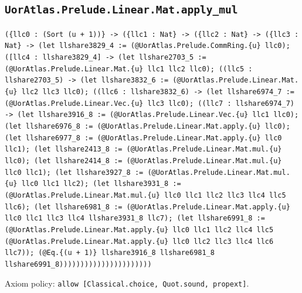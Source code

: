 \documentclass[11pt]{article}
\begin{document}
\subsection*{\texttt{UorAtlas.Prelude.Linear.Mat.apply\_mul}}
\noindent\texttt{(\{llc0 : (Sort (u + 1))\} -> (\{llc1 : Nat\} -> (\{llc2 : Nat\} -> (\{llc3 : Nat\} -> (let llshare3829\_4 := (@UorAtlas.Prelude.CommRing.\{u\} llc0); ([llc4 : llshare3829\_4] -> (let llshare2703\_5 := (@UorAtlas.Prelude.Linear.Mat.\{u\} llc1 llc2 llc0); ((llc5 : llshare2703\_5) -> (let llshare3832\_6 := (@UorAtlas.Prelude.Linear.Mat.\{u\} llc2 llc3 llc0); ((llc6 : llshare3832\_6) -> (let llshare6974\_7 := (@UorAtlas.Prelude.Linear.Vec.\{u\} llc3 llc0); ((llc7 : llshare6974\_7) -> (let llshare3916\_8 := (@UorAtlas.Prelude.Linear.Vec.\{u\} llc1 llc0); (let llshare6976\_8 := (@UorAtlas.Prelude.Linear.Mat.apply.\{u\} llc0); (let llshare6977\_8 := (@UorAtlas.Prelude.Linear.Mat.apply.\{u\} llc0 llc1); (let llshare2413\_8 := (@UorAtlas.Prelude.Linear.Mat.mul.\{u\} llc0); (let llshare2414\_8 := (@UorAtlas.Prelude.Linear.Mat.mul.\{u\} llc0 llc1); (let llshare3927\_8 := (@UorAtlas.Prelude.Linear.Mat.mul.\{u\} llc0 llc1 llc2); (let llshare3931\_8 := (@UorAtlas.Prelude.Linear.Mat.mul.\{u\} llc0 llc1 llc2 llc3 llc4 llc5 llc6); (let llshare6981\_8 := (@UorAtlas.Prelude.Linear.Mat.apply.\{u\} llc0 llc1 llc3 llc4 llshare3931\_8 llc7); (let llshare6991\_8 := (@UorAtlas.Prelude.Linear.Mat.apply.\{u\} llc0 llc1 llc2 llc4 llc5 (@UorAtlas.Prelude.Linear.Mat.apply.\{u\} llc0 llc2 llc3 llc4 llc6 llc7)); (@Eq.\{(u + 1)\} llshare3916\_8 llshare6981\_8 llshare6991\_8))))))))))))))))))))))}\par
\noindent Axiom policy: \texttt{allow [Classical.choice, Quot.sound, propext]}.\par
\end{document}
